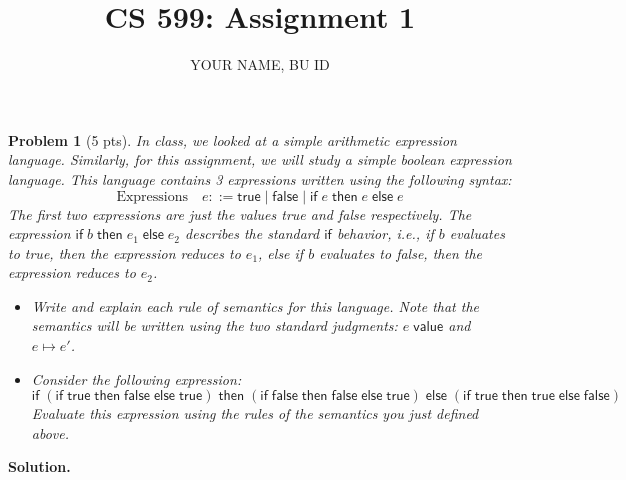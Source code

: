 \documentclass{article}
\title{CS 599: Assignment 1}
\author{YOUR NAME, BU ID}
\date{}
\newcommand{\m}[1]{\mathsf{#1}}
\newcommand{\step}{\mapsto}
\newcommand{\val}[1]{#1 \; \m{value}}
\newcommand{\eif}[3]{\m{if} \; #1 \; \m{then} \; #2 \; \m{else} \; #3}
\newtheorem{problem}{Problem}
\newenvironment{solution}{\textbf{Solution.}}{}
\begin{document}
\maketitle

\begin{problem}[5 pts]
    In class, we looked at a simple arithmetic expression language. Similarly, for this assignment, we will study
    a simple boolean expression language. This language contains 3 expressions written using the following syntax:
    \[
        \text{Expressions} \quad e ::= \m{true} \mid \m{false} \mid \eif{e}{e}{e}
    \]
    The first two expressions are just the values true and false respectively. The expression $\eif{b}{e_1}{e_2}$
    describes the standard $\m{if}$ behavior, i.e., if $b$ evaluates to true, then the expression reduces to $e_1$,
    else if $b$ evaluates to false, then the expression reduces to $e_2$.

    \begin{itemize}
        \item[(3 pts)] Write and explain each rule of semantics for this language. Note that the semantics will be written
        using the two standard judgments: $\val{e}$ and $e \step e'$.
        
        \item[(2 pts)] Consider the following expression:
        \[
            \eif{(\eif{\m{true}}{\m{false}}{\m{true}})}{(\eif{\m{false}}{\m{false}}{\m{true}})}{(\eif{\m{true}}{\m{true}}{\m{false}})}
        \]
        Evaluate this expression using the rules of the semantics you just defined above.
    \end{itemize}
\end{problem}

\begin{solution}

\end{solution}
\end{document}
